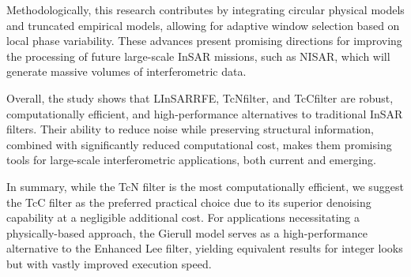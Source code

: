 \documentclass[remotesensing,article,submit,pdftex,moreauthors]{Definitions/mdpi}
\begin{document}
Methodologically, this research contributes by integrating circular physical models and truncated empirical models, allowing for adaptive window selection based on local phase variability. 
These advances present promising directions for improving the processing of future large-scale InSAR missions, such as NISAR, which will generate massive volumes of interferometric data.


%
%
%

Overall, the study shows that LInSARRFE, TcNfilter, and TcCfilter are robust, computationally efficient, and high-performance alternatives to traditional InSAR filters. 
Their ability to reduce noise while preserving structural information, combined with significantly reduced computational cost, makes them promising tools for large-scale interferometric applications, both current and emerging.

In summary, while the TcN filter is the most computationally efficient, we suggest the TcC filter as the preferred practical choice due to its superior denoising capability at a negligible additional cost. 
For applications necessitating a physically-based approach, the Gierull model serves as a high-performance alternative to the Enhanced Lee filter, yielding equivalent results for integer looks but with vastly improved execution speed.
\end{document}
